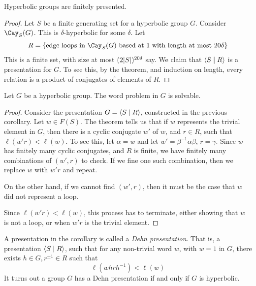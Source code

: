 \documentclass{article}
\begin{document}
\begin{corollary}
    [Gromov] Hyperbolic groups are finitely presented.
\end{corollary}

\begin{proof}
    Let \(S\) be a finite generating set for a hyperbolic group \(G\). Consider \(\Cay_S(G)\). This is \(\delta\)-hyperbolic for some \(\delta\). Let
    \[R = \{\text{edge loops in }\Cay_S(G)\text{ based at 1 with length at most }20\delta\}\]
    This is a finite set, with size at most \((2\abs{S})^{20\delta}\) say. We claim that \(\left\langle S \mid R \right\rangle\) is a presentation for \(G\). To see this, by the theorem, and induction on length, every relation is a product of conjugates of elements of \(R\).
\end{proof}

\begin{corollary}
     Let \(G\) be a hyperbolic group. The word problem in \(G\) is solvable.
\end{corollary}

\begin{proof}
    Consider the presentation \(G = \left\langle S \mid R \right\rangle\), constructed in the previous corollary. Let \(w \in F(S)\). The theorem tells us that if \(w\) represents the trivial element in \(G\), then there is a cyclic conjugate \(w'\) of \(w\), and \(r \in R\), such that \(\ell(w'r) < \ell(w)\). To see this, let \(\alpha = w\) and let \(w' = \beta^{-1}\alpha\beta\), \(r = \gamma\). Since \(w\) has finitely many cyclic conjugates, and \(R\) is finite, we have finitely many combinations of \((w', r)\) to check. If we fine one such combination, then we replace \(w\) with \(w'r\) and repeat.

    On the other hand, if we cannot find \((w', r)\), then it must be the case that \(w\) did not represent a loop.

    Since \(\ell(w'r) < \ell(w)\), this process has to terminate, either showing that \(w\) is not a loop, or when \(w'r\) is the trivial element.
\end{proof}

\begin{remark}
    A presentation in the corollary is called a \emph{Dehn presentation}. That is, a presentation \(\left\langle S \mid R \right\rangle\), such that for any non-trivial word \(w\), with \(w = 1\) in \(G\), there exists \(h \in G, r^{\pm 1}\in R\) such that
    \[\ell(whrh^{-1}) < \ell(w)\]
    It turns out a group \(G\) has a Dehn presentation if and only if \(G\) is hyperbolic.
\end{remark}
\end{document}
